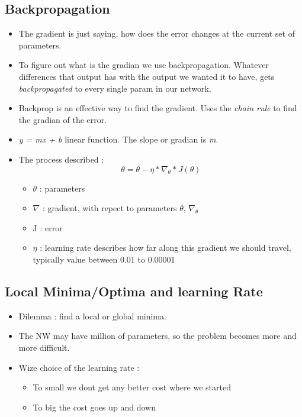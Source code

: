 \documentclass[12pt,a4paper]{article}
\begin{document}
\subsection{Backpropagation}
\begin{itemize}
\item  The gradient is just saying, how does the error changes at the current set of parameters.
\item To figure out what is the gradian we use backpropagation. Whatever differences that output has with the output we wanted it to have, gets \textit{backpropagated} to every single param in our network.
\item Backprop is an effective way to find the gradient. Uses the \textit{chain rule} to find the gradian of the error.
\item \textit{y = mx + b} linear function. The slope or gradian is \textit{m}.
\item The process described : 
\begin{equation} \theta = \theta - \eta * \nabla_\theta * J(\theta)
\end{equation}
\begin{itemize}
\item $\theta$ : parameters
\item $\nabla$ : gradient, with repect to parameters $\theta$, $\nabla_\theta$
\item J : error
\item $\eta$ : learning rate describes how far along this gradient we should travel, typically value between 0.01 to 0.00001
\end{itemize}
\end{itemize}
\subsection{Local Minima/Optima and learning Rate}
\begin{itemize}
\item Dilemma : find a local or global minima.
\item The NW may have million of parameters, so the problem becomes more and more difficult.
\item Wize choice of the learning rate : 
\begin{itemize}
\item To small we dont get any better cost where we started
\item To big the cost goes up and down
\end{itemize} 
\end{itemize}
\end{document}
